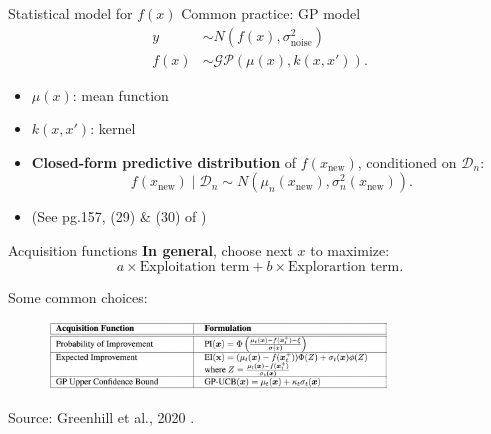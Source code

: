 \documentclass[aspectratio=169]{beamer}					%
\begin{document}
\begin{frame}{Statistical model for $f(x)$}
	Common practice: GP model
	\begin{align*}
		y &\sim N(f(x), \sigma^2_{\text{noise}})\\
		f(x) &\sim \mathcal{GP}(\mu(x), k(x, x')).
	\end{align*}
	
	\begin{itemize}
		\item $\mu(x)$: mean function
		\item $k(x, x')$: kernel
		\pause
		\item \textbf{Closed-form predictive distribution} of $f(x_{\text{new}})$, conditioned on $\mathcal{D}_n$:
		\begin{equation*}
			f(x_{\text{new}}) \mid \mathcal{D}_n \sim N(\mu_n(x_{\text{new}}), \sigma^2_n(x_{\text{new}})).
		\end{equation*}
		\item (See pg.157, (29) \& (30) of \cite{shahriari2015taking})
	\end{itemize}

\end{frame}

\begin{frame}{Acquisition functions}
\textbf{In general}, choose next $x$ to maximize:
\begin{equation*}
	a \times \text{Exploitation term} + b \times \text{Explorartion term}.
\end{equation*}

Some common choices:
\begin{figure}
	\centering
	\includegraphics[width = 0.8\textwidth]{figures/acq-funcs.png}
\end{figure}

{
	\footnotesize
	Source: Greenhill et al., 2020 \cite{greenhill2020bayesian}. 
}
\end{frame}
\end{document}
